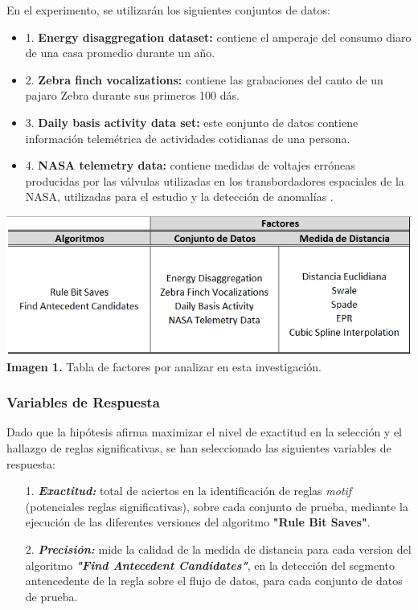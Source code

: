 \begin{itemize}
En el experimento, se utilizar\'an los siguientes conjuntos de datos:
\begin{itemize}
\item 1. \textbf{Energy disaggregation dataset:} contiene el amperaje del consumo diaro de una casa promedio durante un a\~no.
\item 2. \textbf{Zebra finch vocalizations:} contiene las grabaciones del canto de un pajaro Zebra durante sus primeros 100 d\'as.
\item 3. \textbf{Daily basis activity data set:} este conjunto de datos contiene informaci\'on telem\'etrica de actividades cotidianas de una persona.
\item 4. \textbf{NASA telemetry data:} contiene medidas de voltajes err\'oneas producidas por las v\'alvulas utilizadas en los transbordadores espaciales de la NASA, utilizadas para el estudio y la detecci\'on de anomal\'ias .
\end{itemize}
\end{itemize}
\begin{center}
\includegraphics[scale=0.7]{factors.png}\\
\vspace*{10pt}
\footnotesize{\textbf{Imagen 1.} Tabla de factores por analizar en esta investigaci\'on.}
\end{center}
\subsubsection{Variables de Respuesta}
Dado que la hip\'otesis afirma maximizar el nivel de exactitud en la selecci\'on y el hallazgo de reglas significativas, se han seleccionado las siguientes variables de respuesta:
\begin{itemize}
\item [1.] \textbf{\textit{Exactitud:}} total de aciertos en la identificaci\'on de reglas \textit{motif} (potenciales reglas significativas), sobre cada conjunto de prueba, mediante la ejecuci\'on de las diferentes versiones del algoritmo \textbf{"Rule Bit Saves"}.
\item [2.] \textit{\textbf{Precisi\'on:}} mide la calidad de la medida de distancia para cada version del algoritmo \textit{\textbf{"Find Antecedent Candidates"}}, en la detecci\'on del segmento antencedente de la regla sobre el flujo de datos, para cada conjunto de datos de prueba.
\end{itemize}
